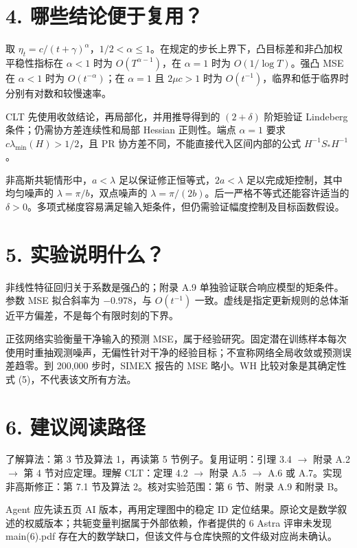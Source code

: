 \documentclass[11pt]{article}
\begin{document}
\section*{4. 哪些结论便于复用？}
取 $\eta_t=c/(t+\gamma)^\alpha$，$1/2<\alpha\le1$。在规定的步长上界下，凸目标差和非凸加权平稳性指标在 $\alpha<1$ 时为 $O(T^{\alpha-1})$，在 $\alpha=1$ 时为 $O(1/\log T)$。强凸 MSE 在 $\alpha<1$ 时为 $O(t^{-\alpha})$；在 $\alpha=1$ 且 $2\mu c>1$ 时为 $O(t^{-1})$，临界和低于临界时分别有对数和较慢速率。

CLT 先使用收敛结论，再局部化，并用推导得到的 $(2+\delta)$ 阶矩验证 Lindeberg 条件；仍需协方差连续性和局部 Hessian 正则性。端点 $\alpha=1$ 要求 $c\lambda_{\min}(H)>1/2$，且 PR 协方差不同，不能直接代入区间内部的公式 $H^{-1}S_*H^{-1}$。

非高斯共轭情形中，$a<\lambda$ 足以保证修正恒等式，$2a<\lambda$ 足以完成矩控制，其中均匀噪声的 $\lambda=\pi/b$，双点噪声的 $\lambda=\pi/(2b)$。后一严格不等式还能容许适当的 $\delta>0$。多项式梯度容易满足输入矩条件，但仍需验证幅度控制及目标函数假设。


\section*{5. 实验说明什么？}
非线性特征回归关于系数是强凸的；附录 A.9 单独验证联合响应模型的矩条件。参数 MSE 拟合斜率为 $-0.978$，与 $O(t^{-1})$ 一致。虚线是指定更新规则的总体渐近平方偏差，不是每个有限时刻的下界。

正弦网络实验衡量干净输入的预测 MSE，属于经验研究。固定潜在训练样本每次使用时重抽观测噪声，无偏性针对干净的经验目标；不宣称网络全局收敛或预测误差趋零。到 200,000 步时，SIMEX 报告的 MSE 略小。WH 比较对象是其确定性式 (5)，不代表该文所有方法。


\section*{6. 建议阅读路径}
了解算法：第 3 节及算法 1，再读第 5 节例子。复用证明：引理 3.4 $\to$ 附录 A.2 $\to$ 第 4 节对应定理。理解 CLT：定理 4.2 $\to$ 附录 A.5 $\to$ A.6 或 A.7。实现非高斯修正：第 7.1 节及算法 2。核对实验范围：第 6 节、附录 A.9 和附录 B。

Agent 应先读五页 AI 版本，再用定理图中的稳定 ID 定位结果。原论文是数学叙述的权威版本；共轭变量判据属于外部依赖，作者提供的 6 Astra 评审未发现 main(6).pdf 存在大的数学缺口，但该文件与仓库快照的文件级对应尚未确认。
\end{document}
